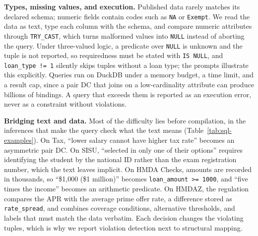 \smallskip\noindent\textbf{Types, missing values, and execution.}
Published data rarely matches its declared schema; numeric fields contain codes such as \texttt{NA} or \texttt{Exempt}. We read the data as text, type each column with the schema, and compare numeric attributes through \texttt{TRY\_CAST}, which turns malformed values into \texttt{NULL} instead of aborting the query. Under three-valued logic, a predicate over \texttt{NULL} is unknown and the tuple is not reported, so requiredness must be stated with \texttt{IS NULL}, and \texttt{loan\_type != 1} silently skips tuples without a loan type; the prompts illustrate this explicitly. Queries run on DuckDB under a memory budget, a time limit, and a result cap, since a pair DC that joins on a low-cardinality attribute can produce billions of bindings. A query that exceeds them is reported as an execution error, never as a constraint without violations.

\smallskip\noindent\textbf{Bridging text and data.}
Most of the difficulty lies before compilation, in the inferences that make the query check what the text means (Table~\ref{tab:sql-examples}). On Tax, ``lower salary cannot have higher tax rate'' becomes an asymmetric pair DC. On SISU, ``selected in only one of their options'' requires identifying the student by the national ID rather than the exam registration number, which the text leaves implicit. On HMDA Checks, amounts are recorded in thousands, so ``\$1,000 (\$1 million)'' becomes \texttt{loan\_amount >= 1000}, and ``five times the income'' becomes an arithmetic predicate. On HMDAZ, the regulation compares the APR with the average prime offer rate, a difference stored as \texttt{rate\_spread}, and combines coverage conditions, alternative thresholds, and labels that must match the data verbatim. Each decision changes the violating tuples, which is why we report violation detection next to structural mapping.

